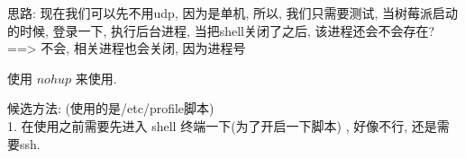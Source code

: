思路: 现在我们可以先不用udp, 因为是单机, 所以, 我们只需要测试, 
当树莓派启动的时候, 登录一下, 执行后台进程, 当把shell关闭了之后, 该进程还会不会存在? ==> 不会, 相关进程也会关闭, 因为进程号

使用 $nohup$ 来使用. \par
候选方法: (使用的是/etc/profile脚本)\\
1. 在使用之前需要先进入 shell 终端一下(为了开启一下脚本) , 好像不行, 还是需要ssh. \\
